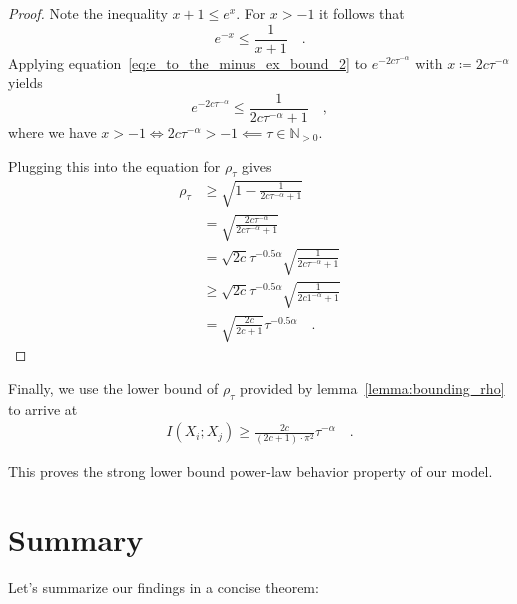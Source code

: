 \documentclass[../../main.tex]{subfiles}
\begin{document}
\begin{proof}
    Note the inequality $x + 1 \leq e^x$. For $x > -1$ it follows that
    \begin{equation}
        e^{-x} \leq \frac{1}{x + 1} \label{eq:e_to_the_minus_ex_bound_2} \quad .
    \end{equation}
    Applying equation~\ref{eq:e_to_the_minus_ex_bound_2} to $e^{-2c \tau^{-\alpha}}$ with $x \coloneqq 2c \tau^{-\alpha}$ yields
    \[
        e^{-2c \tau^{-\alpha}} \leq \frac{1}{2c \tau^{-\alpha} + 1} \quad ,
    \]
    where we have $x > -1 \iff 2c \tau^{-\alpha} > -1 \impliedby \tau \in \mathbb{N}_{>0}$.

    Plugging this into the equation for $\rho_\tau$ gives
    \begin{align*}
        \rho_\tau &\geq \sqrt{1 - \frac{1}{2c \tau^{-\alpha} + 1}} \\
        &= \sqrt{\frac{2c \tau^{-\alpha}}{2c \tau^{-\alpha} + 1}} \\
        &= \sqrt{2c} \tau^{-0.5\alpha} \sqrt{\frac{1}{2c \tau^{-\alpha} + 1}} \\
        &\geq \sqrt{2c} \tau^{-0.5\alpha} \sqrt{\frac{1}{2c 1^{-\alpha} + 1}} \\
        &= \sqrt{\frac{2c}{2c + 1}} \tau^{-0.5 \alpha} \quad .
    \end{align*}
\end{proof}

Finally, we use the lower bound of $\rho_\tau$ provided by lemma~\ref{lemma:bounding_rho} to arrive at
\begin{align*}
    I(X_i; X_j) \geq \frac{2c}{(2c + 1) \cdot \pi^2} \tau^{-\alpha} \quad .
\end{align*}

This proves the strong lower bound power-law behavior property of our model.

\clearpage
\section{Summary}
Let's summarize our findings in a concise theorem:
\end{document}

